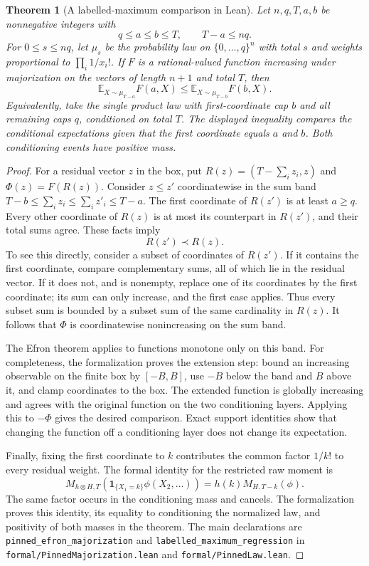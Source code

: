 \documentclass[11pt]{article}
\newtheorem{theorem}{Theorem}
\begin{document}
\begin{theorem}[A labelled-maximum comparison in Lean]\label{thm:leanpinned}
Let $n,q,T,a,b$ be nonnegative integers with
\[
 q\leq a\leq b\leq T,\qquad T-a\leq nq.
\]
For $0\leq s\leq nq$, let $\mu_s$ be the probability law on
$\{0,\ldots,q\}^n$ with total $s$ and weights proportional to
$\prod_i1/x_i!$. If $F$ is a rational-valued function increasing under
majorization on the vectors of length $n+1$ and total $T$, then
\[
 \mathbb E_{X\sim\mu_{T-a}}F(a,X)
 \leq \mathbb E_{X\sim\mu_{T-b}}F(b,X).
\]
Equivalently, take the single product law with first-coordinate cap $b$
and all remaining caps $q$, conditioned on total $T$. The displayed
inequality compares the conditional expectations given that the first
coordinate equals $a$ and $b$. Both conditioning events have positive mass.
\end{theorem}
\begin{proof}
For a residual vector $z$ in the box, put
$R(z)=(T-\sum_i z_i,z)$ and $\Phi(z)=F(R(z))$.
Consider $z\leq z'$ coordinatewise in the sum band
$T-b\leq\sum_i z_i\leq\sum_i z'_i\leq T-a$.
The first coordinate of $R(z')$ is at least $a\geq q$.
Every other coordinate of $R(z)$ is at most its counterpart in $R(z')$,
and their total sums agree. These facts imply
\[
 R(z')\prec R(z).
\]
To see this directly, consider a subset of coordinates of $R(z')$.
If it contains the first coordinate, compare complementary sums, all
of which lie in the residual vector. If it does not, and is nonempty,
replace one of its coordinates by the first coordinate; its sum can
only increase, and the first case applies. Thus every subset sum is
bounded by a subset sum of the same cardinality in $R(z)$.
It follows that $\Phi$ is coordinatewise nonincreasing on the sum band.

The Efron theorem applies to functions monotone only on this band.
For completeness, the formalization proves the extension step: bound
an increasing observable on the finite box by $[-B,B]$, use $-B$ below
the band and $B$ above it, and clamp coordinates to the box.
The extended function is globally increasing and agrees with the
original function on the two conditioning layers. Applying this to
$-\Phi$ gives the desired comparison. Exact support identities show
that changing the function off a conditioning layer does not change
its expectation.

Finally, fixing the first coordinate to $k$ contributes the common
factor $1/k!$ to every residual weight. The formal identity for the
restricted raw moment is
\[
 M_{h\otimes H,T}\!\left(\boldsymbol 1_{\{X_1=k\}}\phi(X_2,\ldots)\right)
 =h(k)M_{H,T-k}(\phi).
\]
The same factor occurs in the conditioning mass and cancels. The
formalization proves this identity, its equality to conditioning the
normalized law, and positivity of both masses in the theorem.
The main declarations are \texttt{pinned\_efron\_majorization} and
\texttt{labelled\_maximum\_regression} in
\texttt{formal/PinnedMajorization.lean} and \texttt{formal/PinnedLaw.lean}.
\end{proof}
\end{document}
